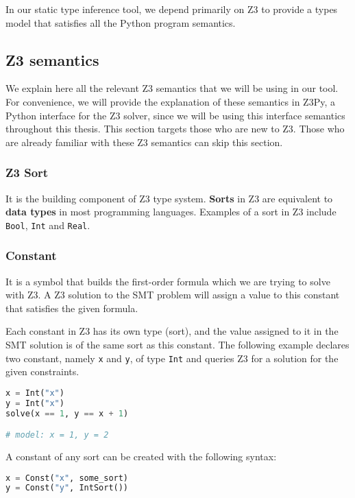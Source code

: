 In our static type inference tool, we depend primarily on Z3 to provide a types model that satisfies all the Python program semantics.

\subsection{Z3 semantics}
We explain here all the relevant Z3 semantics that we will be using in our tool. For convenience, we will provide the explanation of these semantics in Z3Py, a Python interface for the Z3 solver, since we will be using this interface semantics throughout this thesis. This section targets those who are new to Z3. Those who are already familiar with these Z3 semantics can skip this section.

\subsubsection{Z3 Sort}
It is the building component of Z3 type system. \textbf{Sorts} in Z3 are equivalent to \textbf{data types} in most programming languages. Examples of a sort in Z3 include \lstinline|Bool|, \lstinline|Int| and \lstinline|Real|.

\subsubsection{Constant}
It is a symbol that builds the first-order formula which we are trying to solve with Z3. A Z3 solution to the SMT problem will assign a value to this constant that satisfies the given formula.

Each constant in Z3 has its own type (sort), and the value assigned to it in the SMT solution is of the same sort as this constant. The following example declares two constant, namely \lstinline|x| and \lstinline|y|, of type \lstinline|Int| and queries Z3 for a solution for the given constraints.

\begin{lstlisting}[language=python]
x = Int("x")
y = Int("x")
solve(x == 1, y == x + 1)

# model: x = 1, y = 2
\end{lstlisting}

A constant of any sort can be created with the following syntax:

\begin{lstlisting}[language=python]
x = Const("x", some_sort)
y = Const("y", IntSort())
\end{lstlisting}

